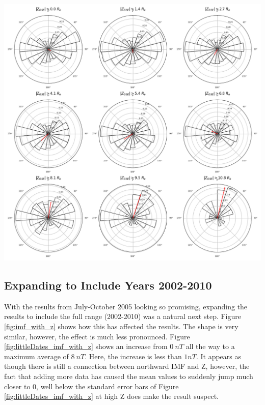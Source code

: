 \documentclass[12pt]{article}
\newenvironment{Figure}
  {\par\medskip\noindent\minipage{\linewidth}}
  {\endminipage\par\medskip}
\begin{document}
\begin{Figure}
    \centering
    \includegraphics[width=\textwidth]{littleDates_imf_angle_hist.png}
    \label{fig:littleDates_imf_angle_hist}
\end{Figure}

\subsection{Expanding to Include Years 2002-2010}
With the results from July-October 2005 looking so promising, expanding the results to include the full range (2002-2010) was a natural next step. Figure \ref{fig:imf_with_z} shows how this has affected the results. The shape is very similar, however, the effect is much less pronounced. Figure \ref{fig:littleDates_imf_with_z} shows an increase from $0\ nT$ all the way to a maximum average of $8\ nT$. Here, the increase is less than $1nT$. It appears as though there is still a connection between northward IMF and Z, however, the fact that adding more data has caused the mean values to suddenly jump much closer to 0, well below the standard error bars of Figure \ref{fig:littleDates_imf_with_z} at high Z does make the result suspect.
\end{document}
